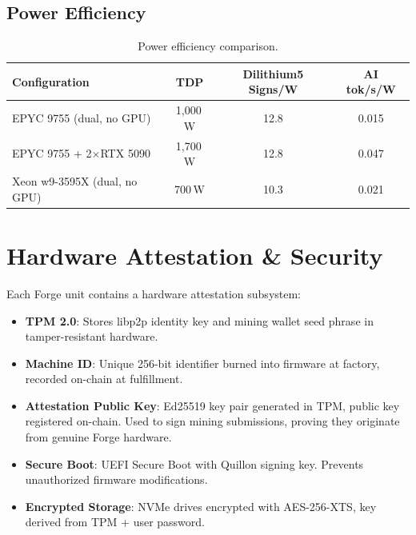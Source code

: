 \documentclass[11pt,a4paper]{article}
\begin{document}
\subsection{Power Efficiency}

\begin{table}[H]
\centering
\begin{tabular}{@{}lccc@{}}
\toprule
\textbf{Configuration} & \textbf{TDP} & \textbf{Dilithium5 Signs/W} & \textbf{AI tok/s/W} \\
\midrule
EPYC 9755 (dual, no GPU) & 1,000\,W & 12.8 & 0.015 \\
EPYC 9755 + 2$\times$RTX 5090 & 1,700\,W & 12.8 & 0.047 \\
Xeon w9-3595X (dual, no GPU) & 700\,W & 10.3 & 0.021 \\
\bottomrule
\end{tabular}
\caption{Power efficiency comparison.}
\end{table}

\section{Hardware Attestation \& Security}

Each Forge unit contains a hardware attestation subsystem:

\begin{itemize}[noitemsep]
    \item \textbf{TPM 2.0}: Stores libp2p identity key and mining wallet seed phrase in tamper-resistant hardware.
    \item \textbf{Machine ID}: Unique 256-bit identifier burned into firmware at factory, recorded on-chain at fulfillment.
    \item \textbf{Attestation Public Key}: Ed25519 key pair generated in TPM, public key registered on-chain. Used to sign mining submissions, proving they originate from genuine Forge hardware.
    \item \textbf{Secure Boot}: UEFI Secure Boot with Quillon signing key. Prevents unauthorized firmware modifications.
    \item \textbf{Encrypted Storage}: NVMe drives encrypted with AES-256-XTS, key derived from TPM + user password.
\end{itemize}

\end{document}
